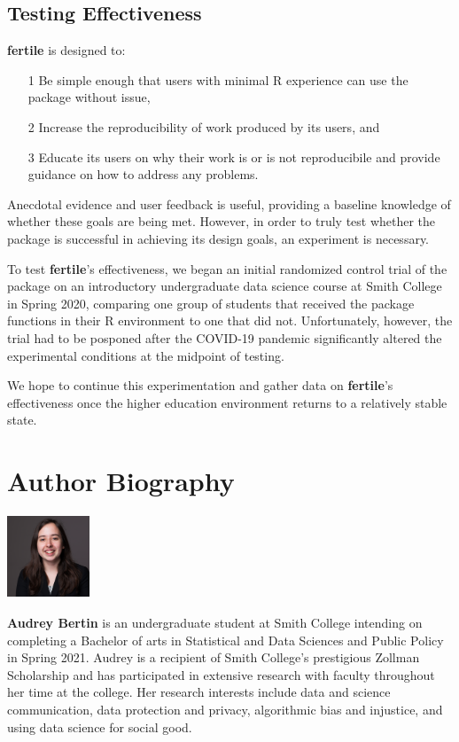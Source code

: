 \documentclass[APA,LATO1COL]{WileyNJD-v2}
\begin{document}
\subsection{Testing Effectiveness}

\textbf{fertile} is designed to: 

\begin{itemize}
\item[1] Be simple enough that users with minimal R experience can use the package without issue,
\item[2] Increase the reproducibility of work produced by its users, and
\item[3] Educate its users on why their work is or is not reproducibile and provide guidance on how to address any problems.
\end{itemize}

Anecdotal evidence and user feedback is useful, providing a baseline knowledge of whether these goals are being met. However, in order to truly test whether the package is successful in achieving its design goals, an experiment is necessary.

To test \textbf{fertile}'s effectiveness, we began an initial randomized control trial of the package on an introductory undergraduate data science course at Smith College in Spring 2020, comparing one group of students that received the package functions in their R environment to one that did not. Unfortunately, however, the trial had to be posponed after the COVID-19 pandemic significantly altered the experimental conditions at the midpoint of testing. 

We hope to continue this experimentation and gather data on \textbf{fertile}'s effectiveness once the higher education environment returns to a relatively stable state. 


\nocite{*}%
%

\section*{Author Biography}

\begin{biography}{\includegraphics[width=70pt,height=70pt]{audrey_bio}}{\textbf{Audrey Bertin} is an undergraduate student at Smith College intending on completing a Bachelor of arts in Statistical and Data Sciences and Public Policy in Spring 2021. Audrey is a recipient of Smith College's prestigious Zollman Scholarship and has participated in extensive research with faculty throughout her time at the college. Her research interests include data and science communication, data protection and privacy, algorithmic bias and injustice, and using data science for social good.

}
\end{biography}
\end{document}
